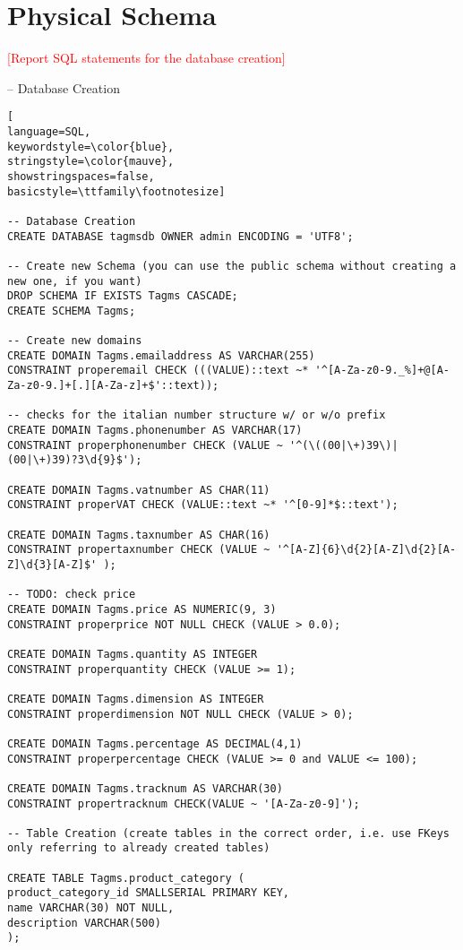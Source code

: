\section{Physical Schema}
\textcolor{red}{[Report SQL statements for the database creation]}

-- Database Creation
\begin{lstlisting}[
language=SQL,
keywordstyle=\color{blue},
stringstyle=\color{mauve},
showstringspaces=false,
basicstyle=\ttfamily\footnotesize]

-- Database Creation
CREATE DATABASE tagmsdb OWNER admin ENCODING = 'UTF8';

-- Create new Schema (you can use the public schema without creating a new one, if you want)
DROP SCHEMA IF EXISTS Tagms CASCADE;
CREATE SCHEMA Tagms;

-- Create new domains
CREATE DOMAIN Tagms.emailaddress AS VARCHAR(255)
CONSTRAINT properemail CHECK (((VALUE)::text ~* '^[A-Za-z0-9._%]+@[A-Za-z0-9.]+[.][A-Za-z]+$'::text));

-- checks for the italian number structure w/ or w/o prefix
CREATE DOMAIN Tagms.phonenumber AS VARCHAR(17)
CONSTRAINT properphonenumber CHECK (VALUE ~ '^(\((00|\+)39\)|(00|\+)39)?3\d{9}$');

CREATE DOMAIN Tagms.vatnumber AS CHAR(11)
CONSTRAINT properVAT CHECK (VALUE::text ~* '^[0-9]*$::text');

CREATE DOMAIN Tagms.taxnumber AS CHAR(16)
CONSTRAINT propertaxnumber CHECK (VALUE ~ '^[A-Z]{6}\d{2}[A-Z]\d{2}[A-Z]\d{3}[A-Z]$' );

-- TODO: check price
CREATE DOMAIN Tagms.price AS NUMERIC(9, 3)
CONSTRAINT properprice NOT NULL CHECK (VALUE > 0.0);

CREATE DOMAIN Tagms.quantity AS INTEGER
CONSTRAINT properquantity CHECK (VALUE >= 1);

CREATE DOMAIN Tagms.dimension AS INTEGER
CONSTRAINT properdimension NOT NULL CHECK (VALUE > 0);

CREATE DOMAIN Tagms.percentage AS DECIMAL(4,1)
CONSTRAINT properpercentage CHECK (VALUE >= 0 and VALUE <= 100);

CREATE DOMAIN Tagms.tracknum AS VARCHAR(30)
CONSTRAINT propertracknum CHECK(VALUE ~ '[A-Za-z0-9]');

-- Table Creation (create tables in the correct order, i.e. use FKeys only referring to already created tables)

CREATE TABLE Tagms.product_category (
product_category_id SMALLSERIAL PRIMARY KEY,
name VARCHAR(30) NOT NULL,
description VARCHAR(500)
);


\end{lstlisting}

